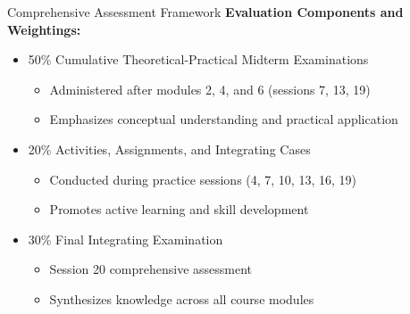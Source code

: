 \documentclass[10pt,aspectratio=169]{beamer}
\newcommand{\concept}[1]{\textbf{#1}}
\begin{document}
\begin{frame}{Comprehensive Assessment Framework}
    \concept{Evaluation Components and Weightings:}
    
    \vspace{0.3cm}
    
    \begin{itemize}
        \item 50\% Cumulative Theoretical-Practical Midterm Examinations
        \begin{itemize}
            \item[\textbullet] Administered after modules 2, 4, and 6 (sessions 7, 13, 19)
            \item[\textbullet] Emphasizes conceptual understanding and practical application
        \end{itemize}
        
        \item 20\% Activities, Assignments, and Integrating Cases
        \begin{itemize}
            \item[\textbullet] Conducted during practice sessions (4, 7, 10, 13, 16, 19)
            \item[\textbullet] Promotes active learning and skill development
        \end{itemize}
        
        \item 30\% Final Integrating Examination
        \begin{itemize}
            \item[\textbullet] Session 20 comprehensive assessment
            \item[\textbullet] Synthesizes knowledge across all course modules
        \end{itemize}
    \end{itemize}
\end{frame}
\end{document}
